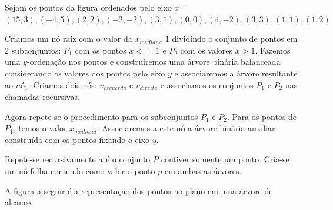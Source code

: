 Sejam os pontos da figura ordenados pelo eixo $x$ = $(15,3),(-4, 5),(2,2),(-2,-2),(3,1),(0,0),(4,-2)
,(3,3),(1,1),(1,2)$

Criamos um nó raiz com o valor da $x_{mediana}$ $1$ dividindo o conjunto de pontos em 2 subconjuntos:
$P_1$ com os pontos $x<=1$ e $P_2$ com os valores $x > 1$.
Fazemos uma $y$-ordenação nos pontos e construiremos uma árvore binária balanceada considerando os 
valores dos pontos pelo eixo $y$ e associaremos a árvore resultante ao $nó_1$.
Criamos dois nós: $v_{esquerda}$ e $v_{direita}$ e associamos os conjuntos $P_1$ e $P_2$ nas chamadas
recursivas.

Agora repete-se o procedimento para os subconjuntos $P_1$ e $P_2$.
Para os pontos de $P_1$, temos o valor $x_{mediana}$. Associaremos a este nó a árvore binária auxiliar
construída com os pontos fixando o eixo $y$.

Repete-se recursivamente  até o conjunto $P$ contiver somente um ponto.
Cria-se um nó folha contendo como valor o ponto $p$ em ambas as árvores.

A figura a seguir é a representação dos pontos no plano em uma árvore de alcance.

